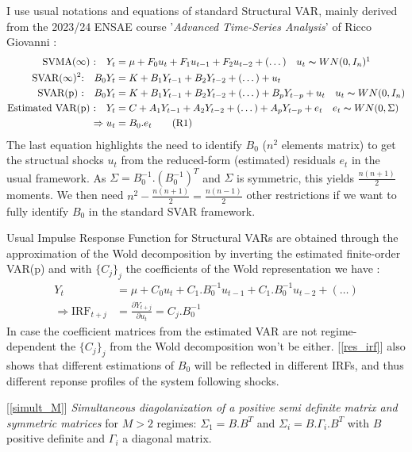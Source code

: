 \quad I use usual notations and equations of standard Structural VAR, mainly derived from the 2023/24 ENSAE course '\textit{Advanced Time-Series Analysis}' of Ricco Giovanni :
\vspace{-.4cm}
\begin{align}
    \textrm{SVMA($\infty$) :} \quad Y_t &= \mu + F_0 u_t + F_1 u_{t-1} + F_2 u_{t-2} + (\dots) \quad u_t \thicksim WN(0,I_n)\footnotemark \nonumber \\
    \textrm{SVAR($\infty$)\footnotemark :} \quad B_0 Y_t &= K + B_1 Y_{t-1} + B_2 Y_{t-2} + (\dots) + u_t \nonumber \\
    \textrm{SVAR(p) :} \quad B_0 Y_t &= K + B_1 Y_{t-1} + B_2 Y_{t-2} + (\dots) + B_p Y_{t-p} + u_t \quad u_t \thicksim WN(0,I_n) \nonumber \\
    \textrm{Estimated VAR(p) :} \quad Y_t &= C + A_1 Y_{t-1} + A_2 Y_{t-2} + (\dots) + A_p Y_{t-p} + e_t \quad e_t \thicksim WN(0,\Sigma) \nonumber \\
    \Rightarrow u_t & = B_0.e_t \tag{R1}\label{res_B}
\end{align} 
\quad The last equation highlights the need to identify $B_0$ ($n^2$ elements matrix) to get the structual shocks $u_t$ from the reduced-form (estimated) residuals $e_t$ in the usual framework. 
As $\Sigma = B_0^{-1}.(B_0^{-1})^{T}$ and $\Sigma$ is symmetric, this yields $\frac{n(n+1)}{2}$ moments. 
We then need $n^2 - \frac{n(n+1)}{2} = \frac{n(n-1)}{2}$ other restrictions if we want to fully identify $B_0$ in the standard SVAR framework.

\bigbreak

Usual Impulse Response Function for Structural VARs are obtained through the approximation of the Wold decomposition by inverting the estimated finite-order VAR(p) and with $\{C_j\}_j$ the coefficients of the Wold representation we have : 
\begin{align*}
    Y_t &= \mu + C_0 u_t + C_1.B_0^{-1} u_{t-1} + C_1.B_0^{-1} u_{t-2} + (\dots) \\
    \Rightarrow \textrm{IRF}_{t+j} &= \frac{\partial Y_{t+j}}{\partial u_t} = C_j.B_0^{-1} \tag{R2}\label{res_irf}
\end{align*}
\quad In case the coefficient matrices from the estimated VAR are not regime-dependent the $\{C_j\}_j$ from the Wold decomposition won't be either. [\ref{res_irf}] also shows that different estimations of $B_0$ will be reflected in different IRFs, and thus different reponse profiles of the system following shocks.

\bigbreak

\label{simult_M}[\ref{simult_M}] \textit{Simultaneous diagolanization of a positive semi definite matrix and symmetric matrices} for $M>2$ regimes:
$\Sigma_1 = B.B^T$ and $\Sigma_i = B.\Gamma_i.B^T$ with $B$ positive definite and $\Gamma_i$ a diagonal matrix.